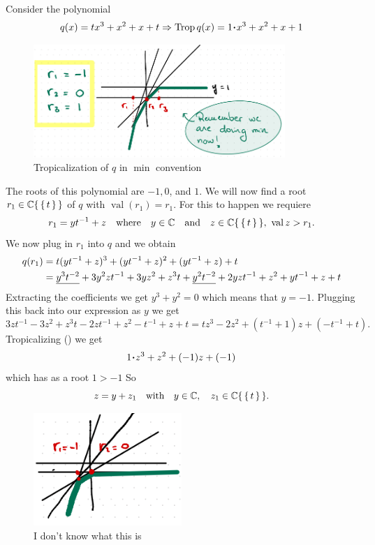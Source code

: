 \documentclass[12pt]{memoir}
\DeclareMathOperator{\val}{val}
\DeclareMathOperator{\Trop}{Trop}
\theoremstyle{definition}
\begin{document}
\begin{Ex}
    Consider the polynomial 
    $$q(x)=tx^3+x^2+x+t\To\Trop q(x)=1\.x^3+x^2+x+1$$
    \begin{figure}[h!]
        \centering
        \includegraphics[width=0.85\textwidth]{figs/fig5-1RealizabilityExampleProof.png}
        \caption{Tropicalization of $q$ in $\min$ convention}
        \label{fig:5.1-RealizabilityExampleProof}
    \end{figure}
    The roots of this polynomial are $-1,0$, and $1$. We will now find a root $r_1\in\mathbb{C}\{\,\{\,t\,\}\,\}$ of $q$ with $\val(r_1)=r_1$. For this to happen we requiere 
    $$r_1=yt^{-1}+z\word{where}y\in\bC\word{and}z\in\bC\set{\set{t}},\ \val z>r_1.$$
    We now plug in $r_1$ into $q$ and we obtain
    \begin{align*}
        q(r_1)&=t(yt^{-1}+z)^3+(yt^{-1}+z)^2+(yt^{-1}+z)+t\\
        &=\underline{y^3t^{-2}}+3y^2zt^{-1}+3yz^2+z^3t+\underline{y^2t^{-2}}+2yzt^{-1}+z^2+yt^{-1}+z+t
    \end{align*}
    Extracting the coefficients we get $y^3+y^2=0$ which means that $y=-1$. Plugging this back into our expression as $y$ we get 
    $$3zt^{-1}-3z^2+z^3t-2zt^{-1}+z^2-t^{-1}+z+t=tz^3-2z^2+(t^{-1}+1)z+(-t^{-1}+t).$$
    Tropicalizing () we get 
    $$1\.z^3+z^2+(-1)z+(-1)$$
    which has as a root $1>-1$ So 
    $$z=y+z_1\quad\text{with}\quad y\in\mathbb{C},\quad z_1\in\mathbb{C}\{\,\{\,t\,\}\,\}.$$  
    \begin{figure}[h!]
        \centering
        \includegraphics[width=0.5\textwidth]{figs/fig5-2EndOfProofFiniteCase.png}
        \caption{I don't know what this is}
        \label{fig:5.2-EndOfProofFiniteCase}
    \end{figure}
\end{Ex} 
\end{document}
